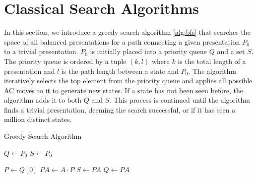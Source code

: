 
\section{Classical Search Algorithms} \label{sec:search}





In this section, we introduce a greedy search algorithm \autoref{alg:bfs} that searches the space of all balanced presentations for a path connecting a given presentation $P_0$ to a trivial presentation.
$P_0$ is initially placed into a priority queue $Q$ and a set $S$. The priority queue is ordered by a tuple $(k, l)$ where $k$ is the total length of a presentation and $l$ is the path length between a state and $P_0$. The algorithm iteratively selects the top element from the priority queue and applies all possible AC moves to it to generate new states. If a state has not been seen before, the algorithm adds it to both $Q$ and $S$. This process is continued until the algorithm finds a trivial presentation, deeming the search successful, or if it has seen a million distinct states. 
\newline

\begin{algorithm}
	\caption{Greedy Search Algorithm}\label{alg:bfs}
	\begin{algorithmic}
		\State $Q \gets P_0$ 
		\State $S \gets P_0$ 

		 
		\State $P \gets Q[0]$ 
		\State $PA \gets A \cdot P$ 
		\State $S \gets PA$
		\State $Q \gets PA$ 

		\EndIf
		\EndFor
		\EndWhile
	\end{algorithmic}
\end{algorithm}

